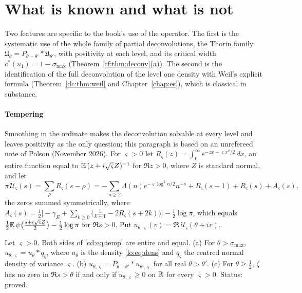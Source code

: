 \section{What is known and what is not}\label{cd:sec:known}

Two features are specific to the book's use of the operator. The first is the systematic use of the whole family of partial deconvolutions, the Thorin family $\mathfrak U_\theta=P_{\theta-\theta'}*\mathfrak U_{\theta'}$, with positivity at each level, and its critical width $c^*(u_1)=1-\sigma_{\max}$ (Theorem~\ref{tf:thm:deconv}(a)). The second is the identification of the full deconvolution of the level one density with Weil's explicit formula (Theorem~\ref{dc:thm:weil} and Chapter~\ref{chap:es}), which is classical in substance.

\paragraph{Tempering} Smoothing in the ordinate makes the deconvolution solvable at every level and leaves positivity as the only question; this paragraph is based on an unrefereed note of Polson (November 2026). For $\varsigma>0$ let $R_\varsigma(z)=\int_0^\infty e^{-zx-\varsigma x^2/2}\,dx$, an entire function equal to $\mathbb{E}\,(z+i\sqrt\varsigma Z)^{-1}$ for $\Re z>0$, where $Z$ is standard normal, and let
\begin{equation}\label{cd:eq:temp}
\pi\,\mathcal U_\varsigma(s)=\sum_\rho R_\varsigma(s-\rho)=-\sum_{n\ge2}\Lambda(n)e^{-\varsigma\log^2n/2}n^{-s}+R_\varsigma(s-1)+R_\varsigma(s)+A_\varsigma(s),
\end{equation}
the zeros summed symmetrically, where $A_\varsigma(s)=\frac12\bigl[-\gamma_E+\sum_{k\ge0}\bigl(\frac1{k+1}-2R_\varsigma(s+2k)\bigr)\bigr]-\frac12\log\pi$, which equals $\frac12\mathbb{E}\,\psi\bigl(\frac{s+i\sqrt\varsigma Z}2\bigr)-\frac12\log\pi$ for $\Re s>0$. Put $u_{\theta,\varsigma}(v)=\Re\,\mathcal U_\varsigma(\theta+iv)$.

\begin{proposition}\label{cd:prop:temp}
Let $\varsigma>0$. Both sides of \eqref{cd:eq:temp} are entire and equal.
(a) For $\theta>\sigma_{\max}$, $u_{\theta,\varsigma}=u_\theta*q_\varsigma$, where $u_\theta$ is the density \eqref{lo:eq:dens} and $q_\varsigma$ the centred normal density of variance $\varsigma$.
(b) $u_{\theta,\varsigma}=P_{\theta-\theta'}*u_{\theta',\varsigma}$ for all real $\theta>\theta'$.
(c) For $\theta\ge\frac12$, $\zeta$ has no zero in $\Re s>\theta$ if and only if $u_{\theta,\varsigma}\ge0$ on $\mathbb{R}$ for every $\varsigma>0$.
Status: proved.
\end{proposition}


